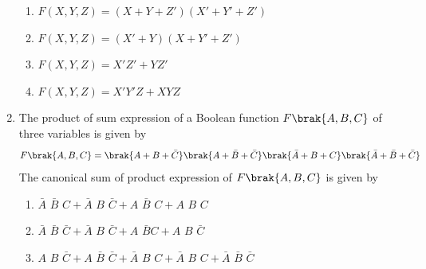 \begin{enumerate}[label=\arabic*.,ref=\theenumi]
\begin{enumerate}
    \item $F(X, Y, Z) = (X + Y + Z') (X' + Y' + Z')$
    \item $F(X, Y, Z) = (X'+ Y) (X + Y' + Z')$
    \item $F(X, Y, Z) = X'Z' + YZ'$
    \item $F(X, Y, Z) = X'Y'Z + XYZ$
\end{enumerate}
\item The product of sum expression of a Boolean function $F\brak{A,B,C}$ of three variables is given by
\begin{align*}
F\brak{A,B,C} = \brak{A + B + \bar{C}}\brak{A + \bar{B} +\bar{C}}\brak{\bar{A} + B + C}
\brak{\bar{A} + \bar{B} + \bar{C}}
\end{align*}
The canonical sum of product expression of $F\brak{A,B,C}$ is  given by
  \begin{enumerate}                               
	  \item $\bar{A}\hspace{4pt}\bar{B}\hspace{4pt}C+ \bar{A}\hspace{4pt}B\hspace{4pt}\bar{C} + A\hspace{4pt}\bar{B}\hspace{4pt}C + A\hspace{4pt}B\hspace{4pt}C$
	  \item $\bar{A}\hspace{4pt}\bar{B}\hspace{4pt}\bar{C} + \bar{A}\hspace{4pt}B\hspace{4pt}\bar{C} + A\hspace{4pt}\bar{B} C + A\hspace{4pt}B\hspace{4pt}\bar{C}$
	  \item $A\hspace{4pt}B\hspace{4pt} \bar{C} + A\hspace{4pt}\bar{B}\hspace{4pt}\bar{C} + \bar{A}\hspace{4pt}B\hspace{4pt}C + \bar{A}\hspace{4pt}B\hspace{4pt}C + \bar{A}\hspace{4pt}\bar{B}\hspace{4pt}\bar{C}$

\end{enumerate}
\end{enumerate}
